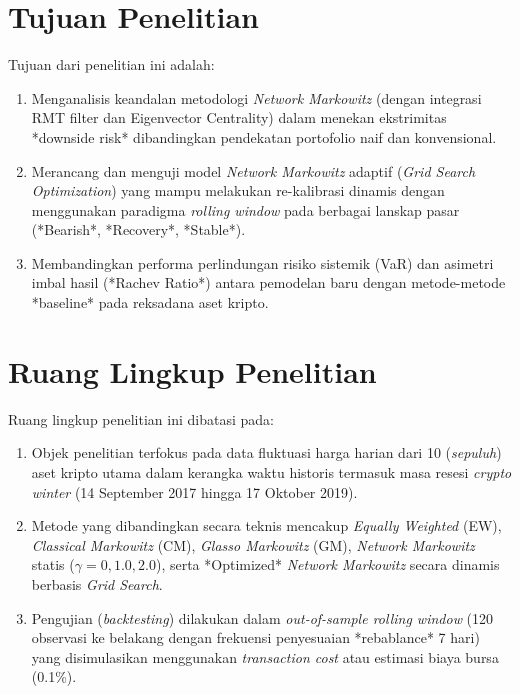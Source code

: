 \documentclass[12pt, a4paper]{report}
\begin{document}
\section{Tujuan Penelitian}

Tujuan dari penelitian ini adalah:
\begin{enumerate}[label=\alph*.]
    \item Menganalisis keandalan metodologi \textit{Network Markowitz} (dengan integrasi RMT filter dan Eigenvector Centrality) dalam menekan ekstrimitas *downside risk* dibandingkan pendekatan portofolio naif dan konvensional.
    \item Merancang dan menguji model \textit{Network Markowitz} adaptif (\textit{Grid Search Optimization}) yang mampu melakukan re-kalibrasi dinamis dengan menggunakan paradigma \textit{rolling window} pada berbagai lanskap pasar (*Bearish*, *Recovery*, *Stable*).
    \item Membandingkan performa perlindungan risiko sistemik (VaR) dan asimetri imbal hasil (*Rachev Ratio*) antara pemodelan baru dengan metode-metode *baseline* pada reksadana aset kripto.
\end{enumerate}

\section{Ruang Lingkup Penelitian}

Ruang lingkup penelitian ini dibatasi pada:
\begin{enumerate}[label=\alph*.]
    \item Objek penelitian terfokus pada data fluktuasi harga harian dari 10 (\textit{sepuluh}) aset kripto utama dalam kerangka waktu historis termasuk masa resesi \textit{crypto winter} (14 September 2017 hingga 17 Oktober 2019).
    \item Metode yang dibandingkan secara teknis mencakup \textit{Equally Weighted} (EW), \textit{Classical Markowitz} (CM), \textit{Glasso Markowitz} (GM), \textit{Network Markowitz} statis ($\gamma=0, 1.0, 2.0$), serta *Optimized* \textit{Network Markowitz} secara dinamis berbasis \textit{Grid Search}.
    \item Pengujian (\textit{backtesting}) dilakukan dalam \textit{out-of-sample rolling window} (120 observasi ke belakang dengan frekuensi penyesuaian *rebablance* 7 hari) yang disimulasikan menggunakan \textit{transaction cost} atau estimasi biaya bursa (0.1\%).
\end{enumerate}
\end{document}
